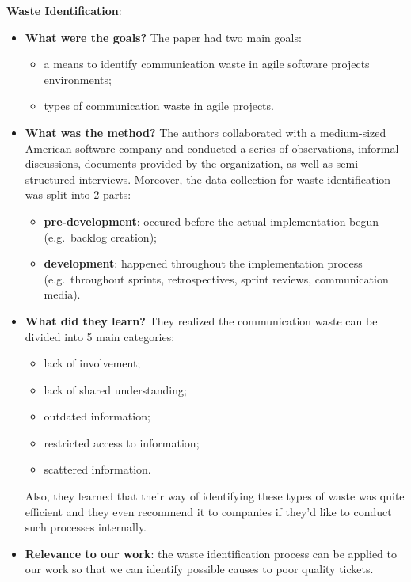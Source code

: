\documentclass{mprop}
\begin{document}
\textbf{Waste Identification}\cite{Korkala2014WasteIdentification}:
\begin{itemize}
  \item \textbf{What were the goals?}
    The paper had two main goals: 
    \begin{itemize}
      \item a means to identify communication waste in agile software projects 
        environments;
      \item types of communication waste in agile projects.
    \end{itemize}
  \item \textbf{What was the method?}
    The authors collaborated with a medium-sized American software company
    and conducted a series of observations, informal discussions, documents 
    provided by the organization, as well as semi-structured interviews. Moreover,
    the data collection for waste identification was split into 2 parts:
      \begin{itemize}
        \item \textbf{pre-development}: occured before the actual implementation
          begun (e.g.\ backlog creation);
        \item \textbf{development}: happened throughout the implementation
          process (e.g.\ throughout sprints, retrospectives, sprint reviews,
          communication media).
      \end{itemize}
  \item \textbf{What did they learn?}
    They realized the communication waste can be divided into 5 main categories:
      \begin{itemize}
        \item lack of involvement;
        \item lack of shared understanding;
        \item outdated information;
        \item restricted access to information;
        \item scattered information.
      \end{itemize}
    Also, they learned that their way of identifying these types of waste was
    quite efficient and they even recommend it to companies if they'd like
    to conduct such processes internally.
  \item \textbf{Relevance to our work}: the waste identification process can
    be applied to our work so that we can identify possible causes to poor 
    quality tickets.
\end{itemize}
\end{document}
